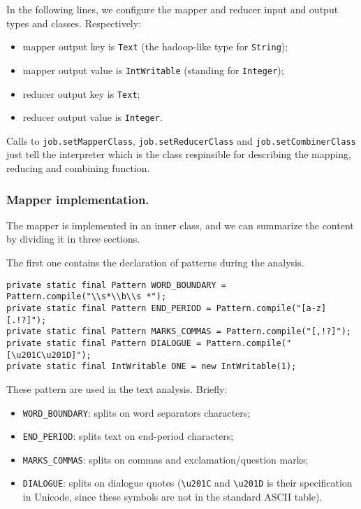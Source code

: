 \documentclass[a4paper,11pt, twoside]{article}
\begin{document}
	\bigskip
	\noindent
	In the following lines, we configure the mapper and reducer input and output types and classes.
	Respectively: \begin{itemize}
		\item mapper output key is \lstinline|Text| (the hadoop-like type for \lstinline|String|);
		\item mapper output value is \lstinline|IntWritable| (standing for \lstinline|Integer|);
		\item reducer output key is \lstinline|Text|;
		\item reducer output value is \lstinline|Integer|.
	\end{itemize}

	Calls to \lstinline|job.setMapperClass|, \lstinline|job.setReducerClass| and \lstinline|job.setCombinerClass| just tell the interpreter which is the class respinsible for describing the mapping, reducing and combining function.
	
	\subsubsection{Mapper implementation.} The mapper is implemented in an inner class, and we can summarize the content by dividing it in three sections.
	
	The first one contains the declaration of patterns during the analysis.
	
	\begin{lstlisting}[firstnumber=70, caption={Declaration of Regular Expression Patterns}, captionpos=b]
private static final Pattern WORD_BOUNDARY = Pattern.compile("\\s*\\b\\s *");
private static final Pattern END_PERIOD = Pattern.compile("[a-z][.!?]");
private static final Pattern MARKS_COMMAS = Pattern.compile("[,!?]");
private static final Pattern DIALOGUE = Pattern.compile("[\u201C\u201D]");
private static final IntWritable ONE = new IntWritable(1);
	\end{lstlisting}
	
	These pattern are used in the text analysis. Briefly: \begin{itemize}
		\item \lstinline|WORD_BOUNDARY|: splits on word separators characters;
		\item \lstinline|END_PERIOD|: splits text on end-period characters;
		\item \lstinline|MARKS_COMMAS|: splits on commas and exclamation/question marks;
		\item \lstinline|DIALOGUE|: splits on dialogue quotes (\lstinline|\u201C| and \lstinline|\u201D| is their specification in Unicode, since these symbols are not in the standard ASCII table). 
	\end{itemize}
\end{document}
